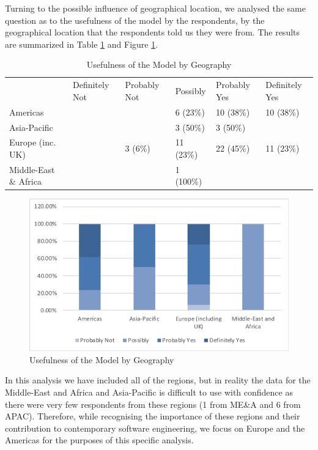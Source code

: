 Turning to the possible influence of geographical location, we analysed the same question as to the usefulness of the model by the respondents, by the geographical location that the respondents told us they were from.  The results are summarized in Table \ref{table:usefulnessbygeo} and Figure \ref{figure:usefulnessbygeo}.

\begin{table}
\caption{Usefulness of the Model by Geography}
\label{table:usefulnessbygeo}
\footnotesize
\begin{tabular}{l p{1.5cm} p{1.5cm} p{1.5cm} p{1.5cm} p{1.5cm}}
 & \centering Definitely Not & 
   \centering Probably Not & 
   \centering Possibly & 
   \centering Probably Yes & 
   \centering Definitely Yes \tabularnewline
Americas              & &         & 6 (23\%)  & 10 (38\%) & 10 (38\%) \\
Asia-Pacific          & &         & 3 (50\%)  & 3 (50\%)  & \\
Europe (inc. UK)      & & 3 (6\%) & 11 (23\%) & 22 (45\%) & 11 (23\%) \\
Middle-East \& Africa & &         & 1 (100\%) &           & \\
\end{tabular}
\end{table}
 
\begin{figure}
\centering
\includegraphics[width=12cm]{Figures/prioritisation-usefulness-by-geo}
\caption{Usefulness of the Model by Geography}
\label{figure:usefulnessbygeo}
\end{figure}

In this analysis we have included all of the regions, but in reality the data for the Middle-East and Africa and Asia-Pacific is difficult to use with confidence as there were very few respondents from these regions (1 from ME\&A and 6 from APAC).  Therefore, while recognising the importance of these regions and their contribution to contemporary software engineering, we focus on Europe and the Americas for the purposes of this specific analysis.

